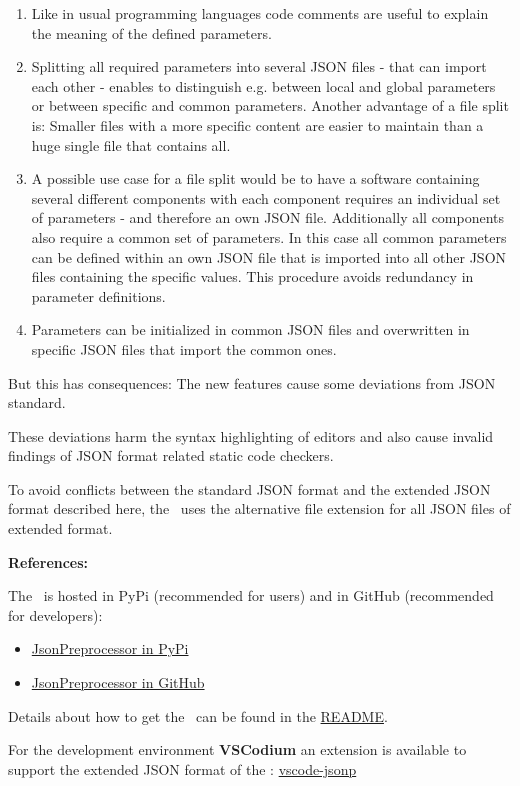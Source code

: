 \begin{enumerate}
   \item Like in usual programming languages code comments are useful to explain the meaning of the defined parameters.
   \item Splitting all required parameters into several JSON files - that can import each other - enables to distinguish e.g. between local and global parameters
         or between specific and common parameters. Another advantage of a file split is: Smaller files with a more specific content are easier to maintain than
         a huge single file that contains all.
   \item A possible use case for a file split would be to have a software containing several different components with each component requires an individual set of
         parameters - and therefore an own JSON file. Additionally all components also require a common set of parameters. In this case all common parameters can be defined
         within an own JSON file that is imported into all other JSON files containing the specific values. This procedure avoids redundancy in parameter definitions.
   \item Parameters can be initialized in common JSON files and overwritten in specific JSON files that import the common ones.
\end{enumerate}

But this has consequences: The new features cause some deviations from JSON standard. 

These deviations harm the syntax highlighting of editors and also cause invalid findings of JSON format related static code checkers.

To avoid conflicts between the standard JSON format and the extended JSON format described here, the \pkg\ uses the alternative file extension
 for all JSON files of extended format.

\newpage

\textbf{References:}

The \pkg\ is hosted in PyPi (recommended for users) and in GitHub (recommended for developers):

\begin{itemize}
   \item \href{https://pypi.org/project/JsonPreprocessor/}{JsonPreprocessor in PyPi}
   \item \href{https://github.com/test-fullautomation/python-jsonpreprocessor}{JsonPreprocessor in GitHub}
\end{itemize}

Details about how to get the \pkg\ can be found in the
\href{https://github.com/test-fullautomation/python-jsonpreprocessor/blob/develop/README.rst}{README}.

For the development environment \textbf{VSCodium} an extension is available to support the extended JSON format of the \pkg:
\href{https://github.com/test-fullautomation/vscode-jsonp}{vscode-jsonp}

